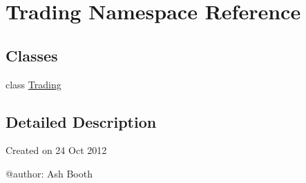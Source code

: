 \hypertarget{namespace_trading}{\section{Trading Namespace Reference}
\label{namespace_trading}
}
\subsection*{Classes}
\begin{DoxyCompactItemize}
\item 
class \hyperlink{class_trading_1_1_trading}{Trading}
\end{DoxyCompactItemize}


\subsection{Detailed Description}
\begin{DoxyVerb}Created on 24 Oct 2012

@author: Ash Booth
\end{DoxyVerb}
 